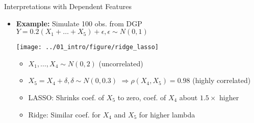 \documentclass[11pt,compress,t,notes=noshow, aspectratio=169, xcolor=table]{beamer}
\begin{document}
\begin{frame}{Interpretations with Dependent Features}
\begin{itemize}

\item \textbf{Example:} Simulate 100 obs. from DGP $Y = 0.2 (X_1 + \dots + X_5) + \epsilon, \epsilon \sim N(0,1)$

\centerline{%
\texttt{[image: ../01\_intro/figure/ridge\_lasso]} }%
        
\begin{itemize}
    \item $X_1, \dots, X_4 \sim N(0, 2)$ (uncorrelated)
    \item $X_5 = X_4 + \delta, \delta \sim N(0, 0.3)$ $\Rightarrow \rho(X_4, X_5) = 0.98$ (highly correlated)
    \item LASSO: Shrinks coef. of $X_5$ to zero, coef. of $X_4$ about $1.5 \times$ higher
    \item Ridge: Similar coef. for $X_4$ and $X_5$ for higher lambda
\end{itemize}

\end{itemize}

\end{frame}
\end{document}
